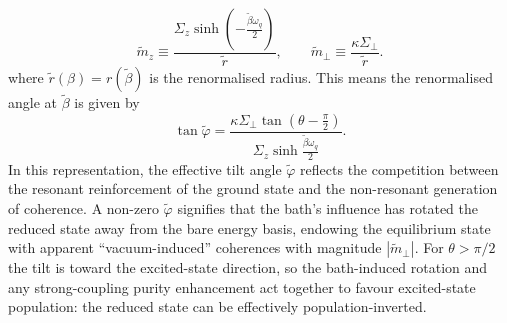 \begin{equation}
    \tilde{m}_{z} \equiv \frac{\Sigma_z \sinh\left(-\frac{\tilde{\beta}\omega_q}{2}\right)}{\tilde{r}}, \qquad \tilde{m}_{\perp} \equiv \frac{\kappa \Sigma_\perp}{\tilde{r}}.
    \label{eq:effective_magnetisations}
\end{equation}
where $\tilde{r}(\beta)=r(\tilde{\beta})$ is the renormalised radius. This means the renormalised angle at $\tilde{\beta}$ is given by
\begin{equation}
\tan\tilde{\varphi} = \frac{\kappa \Sigma_\perp \tan(\theta-\frac{\pi}{2})}{\Sigma_z\sinh\frac{\tilde{\beta}\omega_q}{2}}.
\end{equation}
In this representation, the effective tilt angle $\tilde{\varphi}$ reflects the competition between the resonant reinforcement of the ground state and the non-resonant generation of coherence. A non-zero $\tilde{\varphi}$ signifies that the bath's influence has rotated the reduced state away from the bare energy basis, endowing the equilibrium state with apparent ``vacuum-induced'' coherences with magnitude $|\tilde{m}_\perp|$.  For $\theta>\pi/2$ the tilt is toward the excited-state direction, so the bath-induced rotation and any strong-coupling purity enhancement act together to favour excited-state population: the reduced state can be effectively population-inverted.







